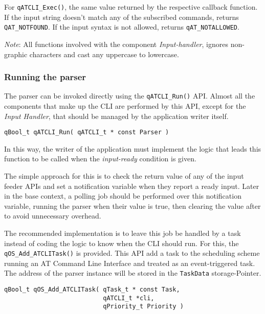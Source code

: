 For \lstinline{qATCLI_Exec()}, the same value returned by the respective callback function. If the input string doesn't match any of the subscribed commands, returns \lstinline{QAT_NOTFOUND}. If the input syntax is not allowed, returns \lstinline{qAT_NOTALLOWED}. 
\medskip

\begin{tcolorbox}
\ArrowBoldDownRight \textit{Note}: All functions involved with the component \textit{Input-handler},  ignores non-graphic characters and cast any uppercase to lowercase.
\end{tcolorbox}

\subsubsection{Running the parser} \label{runningparser}
The parser can be invoked directly using the \lstinline{qATCLI_Run()}  API. Almost all the components that make up the CLI are performed by this API, except for the \textit{Input Handler}, that should be managed by the application writer itself.
\medskip

\begin{lstlisting}[style=CStyle]
qBool_t qATCLI_Run( qATCLI_t * const Parser )
\end{lstlisting}

In this way, the writer of the application must implement the logic that leads this function to be called when the \textit{input-ready} condition is given.

The simple approach for this is to check the return value of any of the input feeder APIs and set a notification variable when they report a ready input. Later in the base context, a polling job should be performed over this notification variable, running the parser when their value is true, then clearing the value after to avoid unnecessary overhead. 

The recommended implementation is to leave this job be handled by a task instead of coding the logic to know when the CLI should run. For this, the \lstinline{qOS_Add_ATCLITask()} is provided. This API  add a task to the scheduling scheme running an AT Command Line Interface and treated as an event-triggered task. The address of the parser instance will be stored in the \lstinline{TaskData} storage-Pointer.
\medskip

\begin{lstlisting}[style=CStyle]
qBool_t qOS_Add_ATCLITask( qTask_t * const Task, 
                           qATCLI_t *cli, 
                           qPriority_t Priority )
\end{lstlisting}


